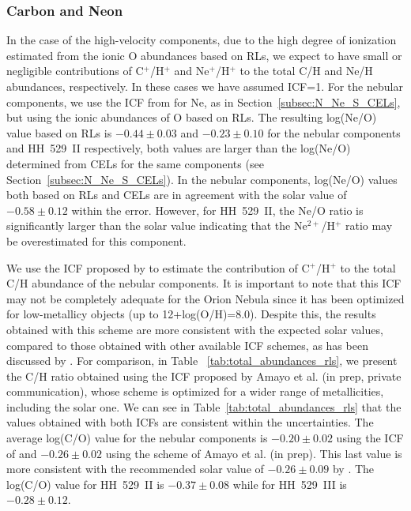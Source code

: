 \documentclass[fleqn,usenatbib]{mnras}
\begin{document}
\subsubsection{Carbon and Neon}
\label{subsubsec:total_abun_C_Ne}


In the case of the high-velocity components, due to the high degree of ionization estimated from the ionic O abundances based on RLs, we expect to have small or negligible contributions of C$^{+}$/H$^{+}$ and Ne$^{+}$/H$^{+}$ to the total C/H and Ne/H abundances, respectively. In these cases we have assumed ICF=1.
For the nebular components, we use the ICF from \citet{Peimbert69} for Ne, as in Section~\ref{subsec:N_Ne_S_CELs}, but using the ionic abundances of O based on RLs. The resulting log(Ne/O) value based on RLs is $-0.44 \pm 0.03$ and $-0.23 \pm 0.10$ for the nebular components and HH~529~II respectively, both values are  larger than the log(Ne/O) determined from CELs for the same components (see Section~\ref{subsec:N_Ne_S_CELs}). In the nebular components, log(Ne/O) values both based on RLs and CELs are in agreement with the solar value of $-0.58 \pm 0.12$ \citep{lodders19} within the error. However, for HH~529~II, the Ne/O ratio is significantly larger than the solar value indicating that the Ne$^{2+}$/H$^{+}$ ratio may be overestimated for this component.

We use the ICF proposed by \citet{berg19} to estimate the contribution of C$^{+}$/H$^{+}$ to the total C/H abundance of the nebular components. It is important to note that this ICF may not be completely adequate for the Orion Nebula since it has been optimized for low-metallicy objects (up to 12+log(O/H)=8.0). Despite this, the results obtained with this scheme are more consistent with the expected solar values, compared to those obtained with other available ICF schemes, as has been discussed by \citet{arellanocorodova20}. For comparison, in Table
~\ref{tab:total_abundances_rls}, we present the C/H ratio obtained using the ICF proposed by Amayo et al. (in prep, private communication), whose scheme is optimized for a wider range of metallicities, including the solar one. We can see in  Table~\ref{tab:total_abundances_rls} that the values obtained with both ICFs are consistent within the uncertainties. The average log(C/O) value for the nebular components is  $-0.20 \pm 0.02$ using the ICF of \citet{berg19} and $-0.26 \pm 0.02$ using the scheme of Amayo et al. (in prep). This last value is more consistent with the recommended solar value of $-0.26 \pm 0.09$ by \citet{lodders19}. The log(C/O) value for HH~529~II is $-0.37\pm0.08$ while for HH~529~III is $-0.28 \pm 0.12$. 
\end{document}
